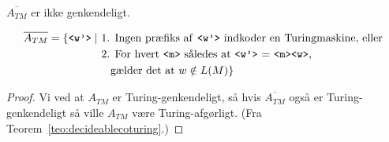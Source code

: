 \begin{corollary}
	$\overline{A_{TM}}$ er ikke genkendeligt.
\end{corollary}

\begin{align*}
	\overline{A_{TM}} = \{\text{\texttt{<w'>}} \mid
	 & \text{ 1. Ingen præfiks af \texttt{<w'>} indkoder en Turingmaskine, eller }   \\
	 & \text{ 2. For hvert \texttt{<m>} således at \texttt{<w'>} = \texttt{<m><w>},} \\ &\;\;\; \text{           gælder det at } w \notin L(M)
	\}
\end{align*}

\begin{proof}

Vi ved at $A_{TM}$ er Turing-genkendeligt, så hvis $\overline{A_{TM}}$ også er Turing-genkendeligt så ville $A_{TM}$ være Turing-afgørligt. (Fra Teorem~\ref{teo:decideablecoturing}.)
\end{proof}


